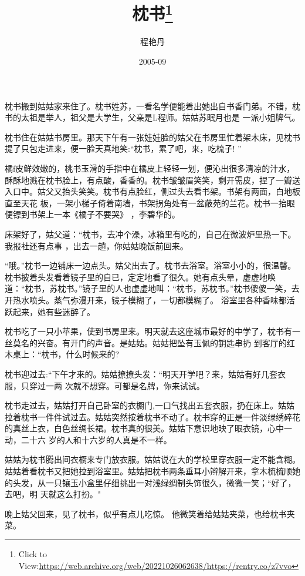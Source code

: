\documentclass{article}
\title{枕书\footnote{Click to View:\url{https://web.archive.org/web/20221026062638/https://rentry.co/z7vvo}}}
\author{程艳丹}
\date{2005-09}
\begin{document}

\maketitle


\Large

﻿枕书搬到姑姑家来住了。枕书姓苏，一看名学便能着出她出自书香门弟。不错，枕书的太祖是举人，祖父是大学生，父亲是L程师。姑姑苏眠月也是
一派小姐牌气。 

枕书住在姑姑书房里。那天下午有一张娃娃脸的姑父在书房里忙着架木床，见枕书提了只包走进来，便一脸天真地笑:“枕书，累了吧，来，吃梳子!
” 

橘f皮鲜效嫩的，桃书玉滑的手指中在橘皮上轻轻一划，便沁出很多清凉的汁水，酥酥地溅在枕书脸上，有点酸，香香的。枕书皱皱眉笑笑，剩开需皮，捏了一瓣送入口中。姑父又抬头笑笑。枕书有点脸红，侧过头去看书架。书架有两面，白地板直至天花
\newpage
板，一架小梯子倚着南墙，书架拐角处有一盆蔽苑的兰花。枕书一抬眼便镖到书架上一本《橘子不要哭》
，李碧华的。 

床架好了，姑父道：“枕书，去冲个澡，冰箱里有吃的，自己在微波炉里热一下。我报社还有点事
，出去一趟，你姑姑晚饭前回来。 

“哦。”枕书一边铺床一边点头。姑父出去了。枕书去浴室。浴室小小的，很温馨。枕书披着头发看着镜子里的自已，定定地看了很久。她有点头晕，虚虚地唤道：“枕书，苏枕书。”镜子里的人也虚虚地叫：“枕书，苏枕书。”枕书傻傻一笑，去开热水喷头。蒸气弥漫开来，镜子模糊了，一切都模糊了。
浴室里各种香味都活跃起来，她有些迷醉了。 

枕书吃了一只小苹果，使到书房里来。明天就去这座城市最好的中学了，枕书有一丝莫名的兴奋。有开门的声音。是姑姑。姑姑把坠有玉佩的钥匙串扔
到客厅的红木桌上：“枕书，什么时候来的? 

\newpage

枕书迎过去:“下午才来的。姑姑撩撩头发：“明天开学吧？来，姑姑有好几套衣服，只穿过一两
次就不想穿。可都是名牌，你来试试。 

枕书走过去，姑姑打开自己卧室的衣橱门,一口气找出五套衣服，扔在床上。姑姑拉着枕书一件件试过去。姑姑突然按着枕书不动了。枕书穿的正是一件淡绿绣碎花的真丝上衣，白色丝绸长裙。枕书真的很美。姑姑下意识地映了眼衣镜，心中一动，二十六
岁的人和十六岁的人真是不一样。 

姑姑为枕书腾出间衣橱来专门放衣服。姑姑说在大的学校里穿衣服一定不能含糊。姑姑着看枕书又把她拉到浴室里。姑姑把枕书两条垂耳小辫解开来，拿木梳梳顺她的头发，从一只镶玉小盒里仔细挑出一对浅绿绸制头饰很久，微微一笑；“好了，去吧，明
天就这么打扮。" 

晚上姑父回来，见了枕书，似乎有点儿吃惊。
他微笑着给姑姑夹菜，也给枕书夹菜。 
\end{document}
